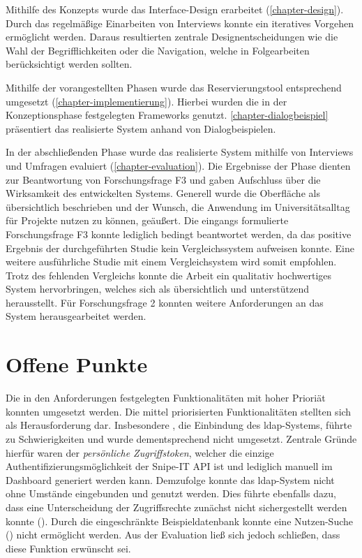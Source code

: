 Mithilfe des Konzepts wurde das Interface-Design erarbeitet
(\ref{chapter-design}). Durch das regelmäßige Einarbeiten von Interviews konnte
ein iteratives Vorgehen ermöglicht werden. Daraus resultierten zentrale
Designentscheidungen wie die Wahl der Begrifflichkeiten oder die Navigation, welche in
Folgearbeiten berücksichtigt werden sollten.

Mithilfe der vorangestellten Phasen wurde das Reservierungstool entsprechend
umgesetzt (\ref{chapter-implementierung}). Hierbei wurden die in der
Konzeptionsphase festgelegten Frameworks genutzt. \ref{chapter-dialogbeispiel}
präsentiert das realisierte System anhand von Dialogbeispielen.

In der abschließenden Phase wurde das realisierte System mithilfe von Interviews und Umfragen
evaluiert (\ref{chapter-evaluation}). Die Ergebnisse der Phase dienten zur Beantwortung von
Forschungsfrage F3 und gaben Aufschluss über die Wirksamkeit des entwickelten Systems. Generell
wurde die Oberfläche als übersichtlich beschrieben und der Wunsch, die Anwendung im
Universitätsalltag für Projekte nutzen zu können, geäußert. Die eingangs formulierte Forschungsfrage
F3 konnte lediglich bedingt beantwortet werden, da das positive Ergebnis der durchgeführten Studie
kein Vergleichssystem aufweisen konnte. Eine weitere ausführliche Studie mit einem Vergleichsystem
wird somit empfohlen. Trotz des fehlenden Vergleichs konnte die Arbeit ein qualitativ hochwertiges
System hervorbringen, welches sich als übersichtlich und unterstützend herausstellt. Für
Forschungsfrage 2 konnten weitere Anforderungen an das System herausgearbeitet werden.

\section{Offene Punkte}
\label{sec:punkte}
Die in den Anforderungen festgelegten Funktionalitäten mit hoher Prioriät
konnten umgesetzt werden. Die mittel priorisierten Funktionalitäten stellten
sich als Herausforderung dar. Insbesondere , die Einbindung des
\ac{ldap}-Systems, führte zu Schwierigkeiten und wurde dementsprechend nicht
umgesetzt. Zentrale Gründe hierfür waren der \textit{persönliche
    Zugriffstoken}, welcher die einzige Authentifizierungsmöglichkeit der Snipe-IT
API ist und lediglich manuell im Dashboard generiert werden kann. Demzufolge
konnte das \ac{ldap}-System nicht ohne Umstände eingebunden und genutzt
werden. Dies führte ebenfalls dazu, dass eine Unterscheidung der Zugriffsrechte
zunächst nicht sichergestellt werden konnte (). Durch die
eingeschränkte Beispieldatenbank konnte eine Nutzen-Suche () nicht
ermöglicht werden. Aus der Evaluation ließ sich jedoch schließen, dass diese
Funktion erwünscht sei.

